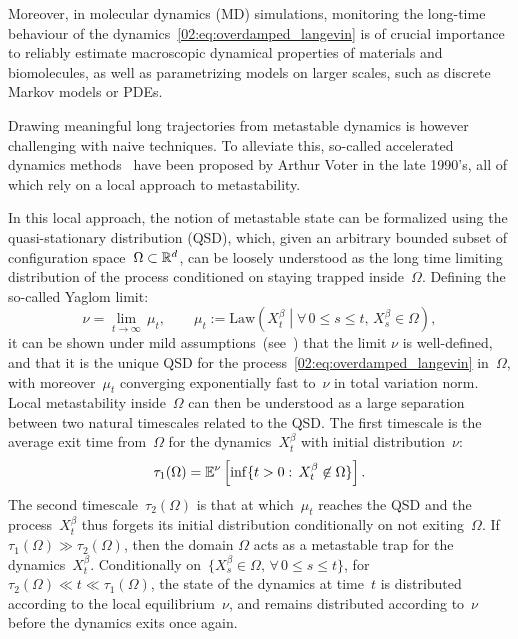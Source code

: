     Moreover, in molecular dynamics (MD) simulations, monitoring the long-time behaviour of the dynamics~\eqref{02:eq:overdamped_langevin} is of crucial importance to reliably estimate macroscopic dynamical properties of materials and biomolecules, as well as parametrizing models on larger scales, such as discrete Markov models or PDEs.
    
    Drawing meaningful long trajectories from metastable dynamics is however challenging with naive techniques. To alleviate this, so-called accelerated dynamics methods~\cite{V97,V98,SV00} have been proposed by Arthur Voter in the late 1990's, all of which rely on a local approach to metastability.

    In this local approach, the notion of metastable state can be formalized using the quasi-stationary distribution (QSD), which, given an arbitrary bounded subset of configuration space~$\Omega\subset\mathbb{R}^d$, can be loosely understood as the long time limiting distribution of the process conditioned on staying trapped inside~$\Omega$.
    Defining the so-called Yaglom limit:
    $$ \nu = \underset{t\to\infty}{\lim}\,\mu_t,\qquad \mu_t := \mathrm{Law}\left(X_t^\beta \middle|\forall\, 0\leq s\leq t,\,X_s^\beta \in \Omega\right),$$
    it can be shown under mild assumptions~(see~\cite{MV12}) that the limit $\nu$ is well-defined, and that it is the unique QSD for the process~\eqref{02:eq:overdamped_langevin} in~$\Omega$, with moreover~$\mu_t$  converging exponentially fast to~$\nu$ in total variation norm. Local metastability inside~$\Omega$ can then be understood as a large separation between two natural timescales related to the QSD. The first timescale is the average exit time from~$\Omega$ for the dynamics~$X_t^\beta$ with initial distribution~$\nu$:
    $$ \tau_1(\Omega) = \mathbb{E}^\nu\left[\inf\{t>0:\,X_t^\beta \not\in \Omega\}\right].$$
    The second timescale~$\tau_2(\Omega)$ is that at which~$\mu_t$ reaches the QSD and the process~$X_t^\beta$ thus forgets its initial distribution conditionally on not exiting~$\Omega$.
    If~$\tau_1(\Omega) \gg \tau_2(\Omega)$, then the domain $\Omega$ acts as a metastable trap for the dynamics~$X_t^\beta$. Conditionally on~$\{X_s^\beta\in\Omega,\,\forall\,0\leq s\leq t\}$, for~$\tau_2(\Omega)\ll t\ll \tau_1(\Omega)$, the state of the dynamics at time~$t$ is distributed according to the local equilibrium~$\nu$, and remains distributed according to~$\nu$ before the dynamics exits once again.

